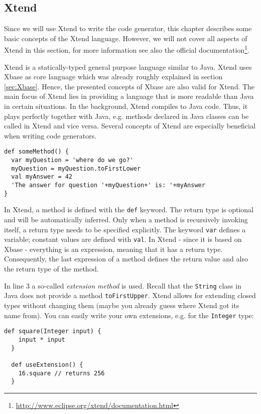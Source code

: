 \subsection{Xtend} \label{sec:Xtend}
 
Since we will use Xtend to write the code generator, this chapter describes some
basic concepts of the Xtend language. However, we will not cover all aspects of
Xtend in this section, for more information see also the official documentation\footnote{\url{http://www.eclipse.org/xtend/documentation.html}}.

Xtend is a statically-typed general purpose language similar to Java. Xtend uses
Xbase as core language which was already roughly explained in section \ref{sec:Xbase}.
Hence, the presented concepts of Xbase are also valid for Xtend. The main focus
of Xtend lies in providing a language that is more readable than Java in certain
situations. In the background, Xtend compiles to Java code. Thus, it plays
perfectly together with Java, e.g. methods declared in Java classes can be called in Xtend
and vice versa. Several concepts of Xtend are especially beneficial when writing code
generators. 

\begin{lstlisting}[language=Xtend]
def someMethod() {
  var myQuestion = 'where do we go?'
  myQuestion = myQuestion.toFirstLower
  val myAnswer = 42
  'The answer for question '+myQuestion+' is: '+myAnswer
}
\end{lstlisting}

In Xtend, a method is defined with the \texttt{def} keyword. The return type is
optional and will be automatically inferred. Only when a method is recursively
invoking itself, a return type needs to be specified explicitly. The keyword 
\texttt{var} defines a variable; constant values are defined with \texttt{val}.
In Xtend - since it is based on Xbase - everything is an expression, meaning that 
it has a return type. Consequently, the last expression of a method defines the
return value and also the return type of the method.

In line 3 a so-called \emph{extension method} is used. Recall that the \texttt{String} class in 
Java does not provide a method \texttt{toFirstUpper}. Xtend allows for extending
closed types without changing them (maybe you already guess where Xtend got its
name from).
You can easily write your own extensions, e.g. for the \texttt{Integer} type:

\begin{lstlisting}[language=Xtend]
  def square(Integer input) {
  	input * input
  }
  
  def useExtension() {
  	16.square // returns 256
  }
\end{lstlisting}

